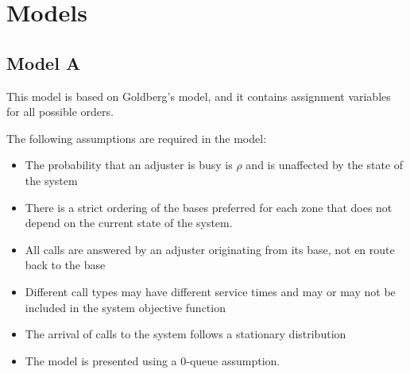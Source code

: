 
\section{Models}
\subsection{Model A}

\begin{frame}
  This model is based on Goldberg's model, and it contains assignment
  variables for all possible orders.

  The following assumptions are required in the model:
  \begin{itemize}
  \item The probability that an adjuster is busy is $\rho$
    and is unaffected by the state of the system
  \item There is a strict ordering of the bases preferred for each zone
    that does not depend on the current state of the system. 
  \item All calls are answered by an adjuster originating from its base,
    not en route back to the base
  \item Different call types may have different service times
    and may or may not be included in the system objective function
  \item The arrival of calls to the system follows a stationary distribution
  \item The model is presented using a 0-queue assumption.
  \end{itemize}
  
\end{frame}


